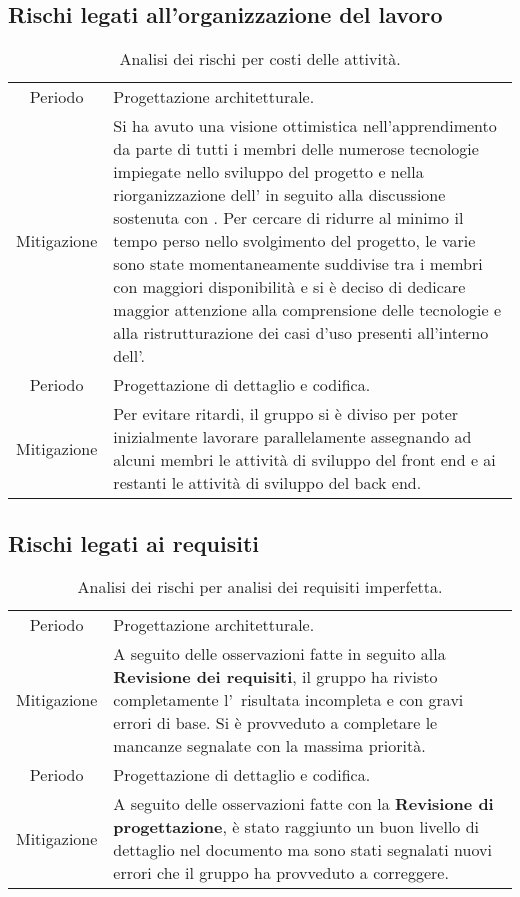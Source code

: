 \subsection{Rischi legati all'organizzazione del lavoro}
\begin{table}[H]
	\centering
	\begin{tabular}{|c|p{11.5cm}|}
		\rowcolor{darkblue} \hline
		\multicolumn{2}{|c|}{\textcolor{white}{\textbf{RO1 - Costi delle attività}}}\\ \hline
		Periodo & Progettazione architetturale.\\ \hline
		Mitigazione & Si ha avuto una visione ottimistica nell'apprendimento da parte di tutti i membri delle numerose tecnologie impiegate nello sviluppo del progetto e nella riorganizzazione dell'\AdR{} in seguito alla discussione sostenuta con \CR{}. Per cercare di ridurre al minimo il tempo perso nello svolgimento del progetto, le varie \glo{attività} sono state momentaneamente suddivise tra i membri con maggiori disponibilità e si è deciso di dedicare maggior attenzione alla comprensione delle tecnologie e alla ristrutturazione dei casi d'uso presenti all'interno dell'\AdR{}.\\ \hline
		Periodo & Progettazione di dettaglio e codifica.\\ \hline
		Mitigazione & Per evitare ritardi, il gruppo si è diviso per poter inizialmente lavorare parallelamente assegnando ad alcuni membri le attività di sviluppo del front end e ai restanti le attività di sviluppo del back end.\\ \hline
	\end{tabular}
	\caption{\label{tab:ARO1}Analisi dei rischi per costi delle attività.}
\end{table}

\subsection{Rischi legati ai requisiti}
\begin{table}[H]
	\centering
	\begin{tabular}{|c|p{11.5cm}|}
		\rowcolor{darkblue} \hline
		\multicolumn{2}{|c|}{\textcolor{white}{\textbf{RR1 - Analisi dei requisiti imperfetta}}}\\ \hline
		Periodo & Progettazione architetturale.\\ \hline
		Mitigazione & A seguito delle osservazioni fatte in seguito alla \textbf{Revisione dei requisiti}, il gruppo {\Gruppo} ha rivisto completamente l'\AdR\ risultata incompleta e con gravi errori di base. Si è provveduto a completare le mancanze segnalate con la massima priorità.\\ \hline
		Periodo & Progettazione di dettaglio e codifica.\\ \hline
		Mitigazione & A seguito delle osservazioni fatte con la \textbf{Revisione di progettazione}, è stato raggiunto un buon livello di dettaglio nel documento ma sono stati segnalati nuovi errori che il gruppo ha provveduto a correggere.\\ \hline
	\end{tabular}
	\caption{\label{tab:ARR1}Analisi dei rischi per analisi dei requisiti imperfetta.}
\end{table}